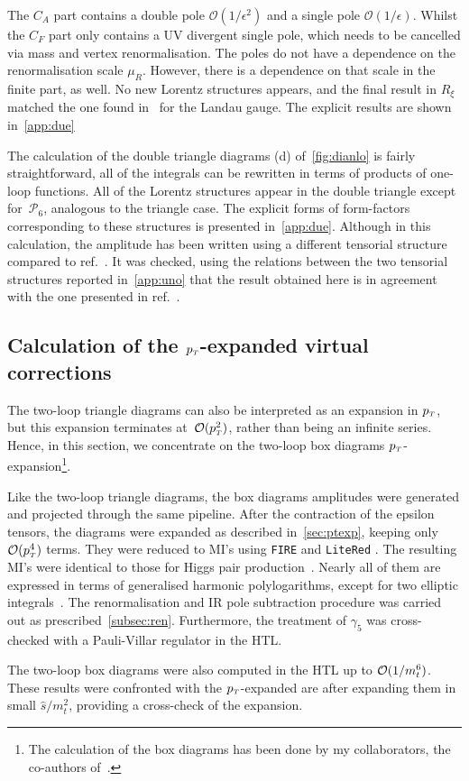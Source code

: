 The $C_A$ part contains a double pole $ \mathcal O( 1/\epsilon^2)$ and a single pole $ \mathcal O( 1/\epsilon)$. Whilst the $C_F$ part only contains a UV divergent single pole, which needs to be cancelled via mass and vertex renormalisation. The poles do not have a dependence on the renormalisation scale $ \mu_R$. However, there is a dependence on that scale in the finite part, as well.  No new Lorentz structures appears, and the final result in $R_\xi$ matched the one found in~\cite{Spira:1995rr,Aglietti:2006tp} for the Landau gauge. The explicit results are shown in~\autoref{app:due}
\par  The calculation of the double triangle diagrams (d) of~\autoref{fig:dianlo} is fairly straightforward, all of the 
integrals can be rewritten in terms of products of one-loop functions. All of the Lorentz structures appear in the double triangle except for~$\mathcal{P}_6$, analogous to the triangle case. The explicit forms of form-factors corresponding to these structures is presented in~\autoref{app:due}. Although in this calculation, the amplitude has been written using a different tensorial structure compared to ref.~\cite{Davies:2020drs}. It was checked,
using the relations between the two tensorial structures reported in~\autoref{app:uno} that the result obtained here is in agreement with the one presented
in ref.~\cite{Hasselhuhn:2016rqt}.
\subsection{Calculation of the $p_{\scriptscriptstyle T}$-expanded virtual corrections}
\par The two-loop triangle diagrams can also be interpreted as an expansion in $p_{\scriptscriptstyle T}$, but this expansion terminates at~${\cal O}(p_{\scriptscriptstyle T}^2)$, rather than being an infinite series. Hence, in this section, we concentrate on the two-loop box diagrams $p_{\scriptscriptstyle T}$-expansion\footnote{The calculation of the box diagrams has been done by my collaborators, the co-authors of~\cite{Alasfar:2021ppe}.}.
\par Like the two-loop triangle diagrams, the box diagrams amplitudes were generated and projected through the same pipeline. After the contraction of the epsilon tensors, the diagrams were expanded as
described in~\autoref{sec:ptexp}, keeping only ${\cal O}(p_{\scriptscriptstyle T}^4)$ terms. They were reduced to MI's
using \texttt{FIRE} \cite{Smirnov:2014hma} and \texttt{LiteRed} \cite{Lee:2013mka}. The
resulting MI's were identical to those for Higgs pair
production~\cite{Bonciani:2018omm}. Nearly all of them are expressed
in terms of generalised harmonic polylogarithms, except for
two elliptic integrals~\cite{vonManteuffel:2017hms, Bonciani:2018uvv}. The renormalisation and IR pole subtraction procedure was carried out as prescribed~\autoref{subsec:ren}. Furthermore, the treatment of $\gamma_5$ was cross-checked with a Pauli-Villar regulator in the HTL.
\par The two-loop box diagrams were also computed in the HTL up to  $\mathcal{O}(1/m_t^6)$. These results were confronted with the $p_{\scriptscriptstyle T}$-expanded are after expanding them in small $\hat s/m_t^2$, providing a cross-check of the expansion. 
